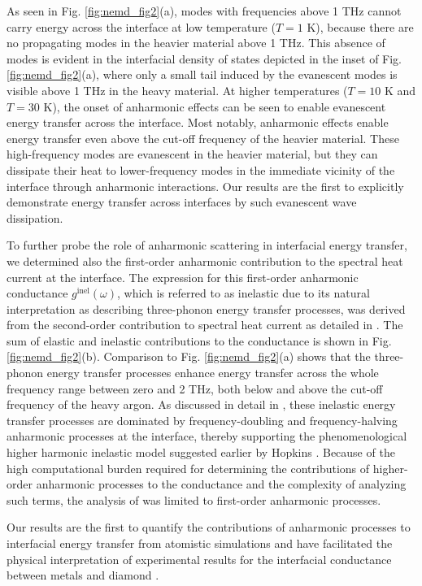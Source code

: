 As seen in Fig. \ref{fig:nemd_fig2}(a), modes with frequencies above 1 THz cannot carry energy across the interface at low temperature ($T=1$ K), because there are no propagating modes in the heavier material above 1 THz. This absence of modes is evident in the interfacial density of states depicted in the inset of Fig. \ref{fig:nemd_fig2}(a), where only a small tail induced by the evanescent modes is visible above 1 THz in the heavy material. At higher temperatures ($T=10$ K and $T=30$ K), the onset of anharmonic effects can be seen to enable evanescent energy transfer across the interface. Most notably, anharmonic effects enable energy transfer even above the cut-off frequency of the heavier material. These high-frequency modes are evanescent in the heavier material, but they can dissipate their heat to lower-frequency modes in the immediate vicinity of the interface through anharmonic interactions. Our results are the first to explicitly demonstrate energy transfer across interfaces by such evanescent wave dissipation.

To further probe the role of anharmonic scattering in interfacial energy transfer, we determined also the first-order anharmonic contribution to the spectral heat current at the interface. The expression for this first-order anharmonic conductance $g^{\textrm{inel}}(\omega)$, which is referred to as inelastic due to its natural interpretation as describing three-phonon energy transfer processes, was derived from the second-order contribution to spectral heat current as detailed in . The sum of elastic and inelastic contributions to the conductance is shown in Fig. \ref{fig:nemd_fig2}(b). Comparison to Fig. \ref{fig:nemd_fig2}(a) shows that the three-phonon energy transfer processes enhance energy transfer across the whole frequency range between zero and 2 THz, both below and above the cut-off frequency of the heavy argon. As discussed in detail in , these inelastic energy transfer processes are dominated by frequency-doubling and frequency-halving anharmonic processes at the interface, thereby supporting the phenomenological higher harmonic inelastic model suggested earlier by Hopkins \cite{hopkins09_jap}. Because of the high computational burden required for determining the contributions of higher-order anharmonic processes to the conductance and the complexity of analyzing such terms, the analysis of  was limited to first-order anharmonic processes.

Our results are the first to quantify the contributions of anharmonic processes to interfacial energy transfer from atomistic simulations and have facilitated the physical interpretation of experimental results for the interfacial conductance between metals and diamond \cite{hohensee15}. 

